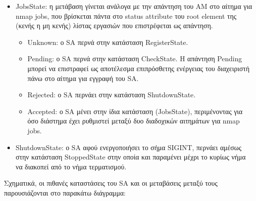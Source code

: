 \documentclass[a4paper,11pt]{article}
\begin{document}
\begin{sloppypar}
\begin{itemize}
\begin{itemize}
\end{itemize} 


\item JobsState: η μετάβαση γίνεται ανάλογα με την απάντηση του AM στο αίτημα για nmap jobs, που βρίσκεται πάντα στο status attribute του root element της (κενής η μη κενής) λίστας εργασιών που επιστρέφεται ως απάντηση.
\begin{itemize}

\item Unknown: ο SA περνά στην κατάσταση RegisterState.

\item Pending: ο SA περνά στην κατάσταση CheckState. Η απάντηση Pending μπορεί να επιστραφεί ως αποτέλεσμα επιπρόσθετης ενέργειας του διαχειριστή πάνω στο αίτημα για εγγραφή του SA.

\item Rejected: ο SA περνάει στην κατάσταση ShutdownState.

\item Accepted: ο SA μένει στην ίδια κατάσταση (JobsState), περιμένοντας για όσο διάστημα έχει ρυθμιστεί μεταξύ δυο διαδοχικών αιτημάτων για nmap jobs.

\end{itemize} 

\item ShutdownState: ο SA αφού ενεργοποιήσει το σήμα SIGINT, περνάει αμέσως στην κατάσταση StoppedState στην οποία και παραμένει μέχρι το κυρίως νήμα να διακοπεί από το νήμα τερματισμού.

\end{itemize}

Σχηματικά, οι πιθανές καταστάσεις του SA και οι μεταβάσεις μεταξύ τους παρουσιάζονται στο παρακάτω διάγραμμα:

\newpage


\end{sloppypar}
\end{document}
